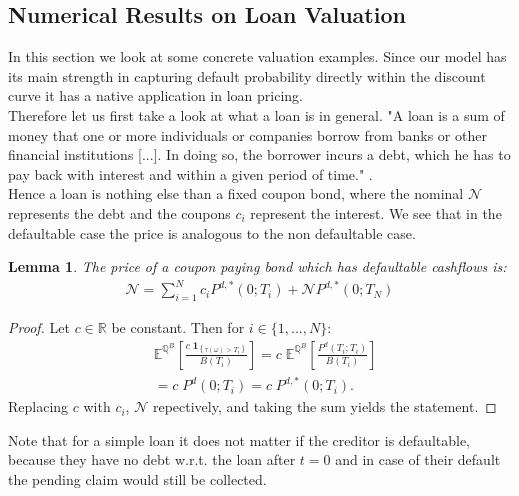 \documentclass[12pt]{article}
\newtheorem{lemma}[theorem]{Lemma}
\begin{document}
	
	\subsection{Numerical Results on Loan Valuation}\label{sec:numericalvaluation}
	In this section we look at some concrete valuation examples. Since our model has its main strength in capturing default probability directly within the discount curve it has a native application in loan pricing.\\
	Therefore let us first take a look at what a loan is in general. "A loan is a sum of money that one or more individuals or companies borrow from banks or other financial institutions [...]. In doing so, the borrower incurs a debt, which he has to pay back with interest and within a given period of time." \cite{corpFinInst}.\\
	Hence a loan is nothing else than a fixed coupon bond, where the nominal $\mathcal{N}$ represents the debt and the coupons $c_i$ represent the interest.
	We see that in the defaultable case the price is analogous to  the non defaultable case.
	\begin{lemma}
		The price of a coupon paying bond which has defaultable cashflows is:
		\begin{align*}
			\mathcal{N} = \sum_{i=1}^{N}c_i P^{d,*}(0;T_i) + \mathcal{N}P^{d,*}(0;T_N)
		\end{align*}
	\end{lemma}
	\begin{proof}
		Let $c\in \mathbb{R}$ be constant. Then for $i \in \{1, ..., N\}$:
		\begin{align*}
			&\mathbb{E}^{\mathbb{Q}^B}\left[\frac{c\;\mathbf{1}_{\left\{\tau(\omega) > T_{i} \right\}}}{B(T_i)}\right] = c \; \mathbb{E}^{\mathbb{Q}^B}\left[ 
			\frac{P^d(T_i;T_i)}{B(T_i)} \right]\\
			&= c \; P^d(0;T_i) = c \; P^{d,*}(0;T_i).
		\end{align*}
		Replacing $c$ with $c_i$, $\mathcal{N}$ repectively, and taking the sum yields the statement.
	\end{proof}
	Note that for a simple loan it does not matter if the creditor is defaultable, because they have no debt w.r.t. the loan after $t=0$ and in case of their default the pending claim would still be collected.
\end{document}
